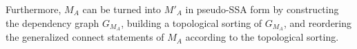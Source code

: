 Furthermore, $M_A$ can be turned into $M'_A$ in pseudo-SSA form by constructing the dependency graph $G_{M_A}$, building a topological sorting of $G_{M_A}$, and reordering the generalized connect statements of $M_A$ according to the topological sorting.

